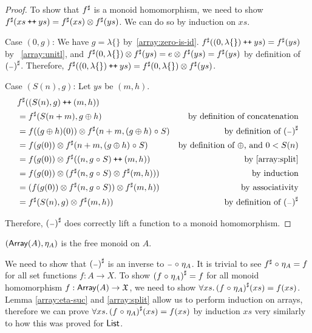 \begin{proof}
    To show that ${f}^{\sharp}$ is a monoid homomorphism,
    we need to show ${f}^{\sharp}(xs \mathbin{\text{\ttfamily\upshape ++}} ys) = {f}^{\sharp}(xs) \otimes {f}^{\sharp}(ys)$.
    We can do so by induction on $xs$.

    Case $(0, g)$:
    We have $g = \lambda\{\}$ by~\ref{array:zero-is-id}.
    ${f}^{\sharp}((0, \lambda\{\}) \mathbin{\text{\ttfamily\upshape ++}} ys) = {f}^{\sharp}(ys)$ by ~\ref{array:unitl},
    and ${f}^{\sharp}(0, \lambda\{\}) \otimes {f}^{\sharp}(ys) = e \otimes {f}^{\sharp}(ys) = {f}^{\sharp}(ys)$
    by definition of ${({\scriptstyle{-}})}^{\sharp}$. Therefore,
    ${f}^{\sharp}((0, \lambda\{\}) \mathbin{\text{\ttfamily\upshape ++}} ys) = {f}^{\sharp}(0, \lambda\{\}) \otimes {f}^{\sharp}(ys)$.

    Case $(S(n), g)$: Let $ys$ be $(m, h)$.
    \begin{align*}
       & {f}^{\sharp}((S(n), g) \mathbin{\text{\ttfamily\upshape ++}} (m, h)) \\
       & = {f}^{\sharp}(S(n + m), g \oplus h) & \text{by definition of concatenation} \\
       & = f((g \oplus h)(0)) \otimes {f}^{\sharp}(n + m, (g \oplus h) \mathrel{\circ} S) & \text{by definition of ${({\scriptstyle{-}})}^{\sharp}$} \\
       & = f(g(0)) \otimes {f}^{\sharp}(n + m, (g \oplus h) \mathrel{\circ} S) & \text{by definition of $\oplus$, and $0 < S(n)$} \\
       & = f(g(0)) \otimes {f}^{\sharp}((n, g \mathrel{\circ} S) \mathbin{\text{\ttfamily\upshape ++}} (m, h)) & \text{by~\ref{array:split}} \\
       & = f(g(0)) \otimes ({f}^{\sharp}(n, g \mathrel{\circ} S) \otimes {f}^{\sharp}(m, h))) & \text{by induction} \\
       & = (f(g(0)) \otimes {f}^{\sharp}(n, g \mathrel{\circ} S)) \otimes {f}^{\sharp}(m, h)) & \text{by associativity} \\
       & = {f}^{\sharp}(S(n), g) \otimes {f}^{\sharp}(m, h)) & \text{by definition of ${({\scriptstyle{-}})}^{\sharp}$} \\
    \end{align*}

    Therefore, ${({\scriptstyle{-}})}^{\sharp}$ does correctly lift a function to a monoid homomorphism.
\end{proof}

\begin{propositionrep}
    $(\operatorname{\mathsf{Array}}(A),\eta_A)$ is the free monoid on $A$.
\end{propositionrep}

\begin{proofsketch}
    We need to show that ${({\scriptstyle{-}})}^{\sharp}$ is an inverse to ${\scriptstyle{-}} \mathrel{\circ} \eta_A$.
    It is trivial to see ${f}^{\sharp} \mathrel{\circ} \eta_A = f$ for all set functions $f : A \to X$.
    To show ${(f \mathrel{\circ} \eta_A)}^{\sharp} = f$ for all monoid homomorphism $f : \operatorname{\mathsf{Array}}(A) \to \mathfrak{X}$,
    we need to show $\forall xs.\, {(f \mathrel{\circ} \eta_A)}^{\sharp}(xs) = f(xs)$.
    Lemma \ref{array:eta-suc} and \ref{array:split} allow us to perform induction on arrays,
    therefore we can prove $\forall xs.\, {(f \mathrel{\circ} \eta_A)}^{\sharp}(xs) = f(xs)$ by induction $xs$
    very similarly to how this was proved for $\operatorname{\mathsf{List}}$.
\end{proofsketch}

